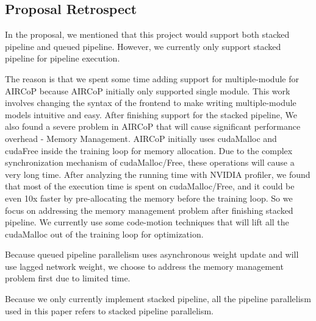 \documentclass[sigplan, nonacm]{acmart}\settopmatter{printfolios=true,printccs=false,printacmref=false}
\begin{document}
\subsection{Proposal Retrospect}
In the proposal, we mentioned that this project would support both stacked pipeline and queued pipeline. However, we currently only support stacked pipeline for pipeline execution.\par
The reason is that we spent some time adding support for multiple-module for AIRCoP because AIRCoP initially only supported single module. This work involves changing the syntax of the frontend to make writing multiple-module models intuitive and easy. After finishing support for the stacked pipeline, We also found a severe problem in AIRCoP that will cause significant performance overhead - Memory Management. AIRCoP initially uses cudaMalloc and cudaFree inside the training loop for memory allocation. Due to the complex synchronization mechanism of cudaMalloc/Free, these operations will cause a very long time. After analyzing the running time with NVIDIA profiler, we found that most of the execution time is spent on cudaMalloc/Free, and it could be even 10x faster by pre-allocating the memory before the training loop. So we focus on addressing the memory management problem after finishing stacked pipeline. We currently use some code-motion techniques that will lift all the cudaMalloc out of the training loop for optimization.\par
Because queued pipeline parallelism uses asynchronous weight update and will use lagged network weight, we choose to address the memory management problem first due to limited time.\par
Because we only currently implement stacked pipeline, all the pipeline parallelism used in this paper refers to stacked pipeline parallelism.
\end{document}
